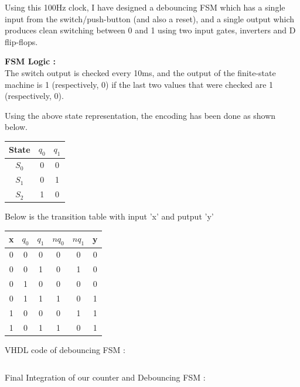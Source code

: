 \documentclass[a4paper, 11pt]{article}
\begin{document}
Using this 100Hz clock, I have designed a debouncing FSM which has a single
input from the switch/push-button (and also a reset), and a single
output which produces clean switching between 0 and 1 using two input gates, inverters and D flip-flops.

{\bf FSM Logic :} \\
The switch output is checked every 10ms, and the output of the finite-state machine is 1 (respectively, 0) if the last two values that were checked are 1 (respectively, 0).


Using the above state representation, the encoding has been done as shown below.
\begin{center}
\begin{tabular}{| c | c | c |}
\hline
\bf State & \bf $q_0$ & \bf $q_1$\\
\hline
$S_0$ & 0 & 0 \\
$S_1$ & 0 & 1 \\
$S_2$ & 1 & 0 \\
\hline
\end{tabular}
\end{center}

Below is the transition table with input 'x' and putput 'y'
\begin{center}
\begin{tabular}{| c | c | c | c | c | c |}
\hline
\bf x & \bf $q_0$ & \bf $q_1$ & \bf $nq_0$ & \bf $nq_1$ & \bf y \\
\hline
0 & 0 & 0 & 0 & 0 & 0 \\
0 & 0 & 1 & 0 & 1 & 0\\
0 & 1 & 0 & 0 & 0 & 0 \\
0 & 1 & 1 & 1 & 0 & 1 \\
1 & 0 & 0 & 0 & 1 & 1 \\
1 & 0 & 1 & 1 & 0 & 1 \\
\hline
\end{tabular}
\end{center}

VHDL code of debouncing FSM :\\
\inputminted[linenos]{vhdl}{debounce.vhd}

\noindent Final Integration of our counter and Debouncing FSM :
\inputminted[linenos]{vhdl}{DUT.vhd}
\end{document}
